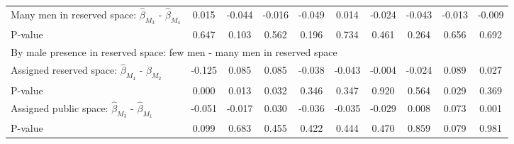 \begin{tabular}{l*{9}{c}}
\quad Many men in reserved space: $\hat\beta_{M_3}$ - $\hat\beta_{M_4}$&       0.015         &      -0.044         &      -0.016         &      -0.049         &       0.014         &      -0.024         &      -0.043         &      -0.013         &      -0.009         \\
\quad P-value       &       0.647         &       0.103         &       0.562         &       0.196         &       0.734         &       0.461         &       0.264         &       0.656         &       0.692         \\
\multicolumn{10}{l}{By male presence in reserved space: few men - many men in reserved space} \\ \quad Assigned reserved space: $\hat\beta_{M_4}$ - $\hat\beta_{M_2}$&      -0.125         &       0.085         &       0.085         &      -0.038         &      -0.043         &      -0.004         &      -0.024         &       0.089         &       0.027         \\
\quad P-value       &       0.000         &       0.013         &       0.032         &       0.346         &       0.347         &       0.920         &       0.564         &       0.029         &       0.369         \\
\quad Assigned public space: $\hat\beta_{M_3}$ - $\hat\beta_{M_1}$&      -0.051         &      -0.017         &       0.030         &      -0.036         &      -0.035         &      -0.029         &       0.008         &       0.073         &       0.001         \\
\quad P-value       &       0.099         &       0.683         &       0.455         &       0.422         &       0.444         &       0.470         &       0.859         &       0.079         &       0.981         \\
\hline\hline \end{tabular}
